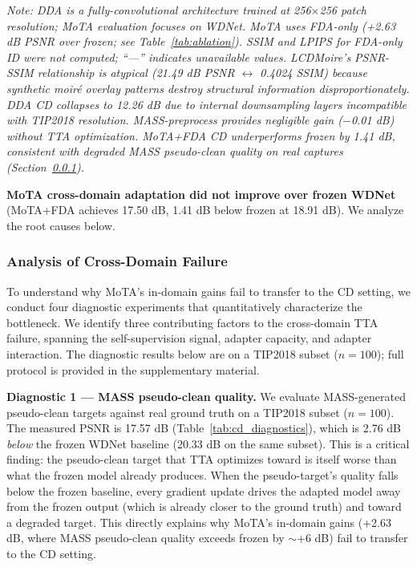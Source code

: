 \documentclass[10pt,twocolumn,letterpaper]{article}
\begin{document}
{\raggedright\small\textit{Note: DDA is a fully-convolutional architecture trained at 256$\times$256 patch resolution; MoTA evaluation focuses on WDNet. MoTA uses FDA-only (+2.63 dB PSNR over frozen; see Table~\ref{tab:ablation}). SSIM and LPIPS for FDA-only ID were not computed; ``---'' indicates unavailable values. LCDMoire's PSNR-SSIM relationship is atypical (21.49 dB PSNR $\leftrightarrow$ 0.4024 SSIM) because synthetic moir\'{e} overlay patterns destroy structural information disproportionately. DDA CD collapses to 12.26 dB due to internal downsampling layers incompatible with TIP2018 resolution. MASS-preprocess provides negligible gain ($-$0.01 dB) without TTA optimization. MoTA+FDA CD underperforms frozen by 1.41 dB, consistent with degraded MASS pseudo-clean quality on real captures (Section~\ref{sec:cd_failure}).}}

\textbf{MoTA cross-domain adaptation did not improve over frozen WDNet} (MoTA+FDA achieves 17.50 dB, 1.41 dB below frozen at 18.91 dB). We analyze the root causes below.

\subsubsection{Analysis of Cross-Domain Failure}
\label{sec:cd_failure}

To understand why MoTA's in-domain gains fail to transfer to the CD setting, we conduct four diagnostic experiments that quantitatively characterize the bottleneck. We identify three contributing factors to the cross-domain TTA failure, spanning the self-supervision signal, adapter capacity, and adapter interaction. The diagnostic results below are on a TIP2018 subset ($n=100$); full protocol is provided in the supplementary material.

\smallskip
\noindent\textbf{Diagnostic 1 --- MASS pseudo-clean quality.} We evaluate MASS-generated pseudo-clean targets against real ground truth on a TIP2018 subset ($n=100$). The measured PSNR is 17.57 dB (Table~\ref{tab:cd_diagnostics}), which is 2.76 dB \textit{below} the frozen WDNet baseline (20.33 dB on the same subset). This is a critical finding: the pseudo-clean target that TTA optimizes toward is itself worse than what the frozen model already produces. When the pseudo-target's quality falls below the frozen baseline, every gradient update drives the adapted model away from the frozen output (which is already closer to the ground truth) and toward a degraded target. This directly explains why MoTA's in-domain gains (+2.63 dB, where MASS pseudo-clean quality exceeds frozen by $\sim$+6 dB) fail to transfer to the CD setting.
\end{document}
